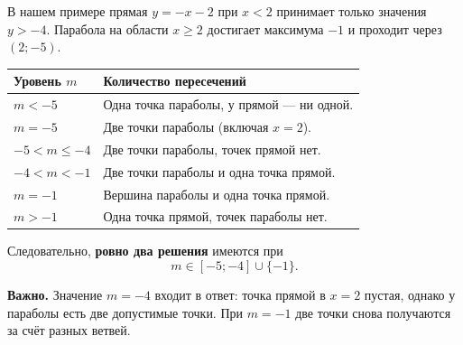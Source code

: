 \documentclass[a4paper,12pt]{article}
\newcommand{\key}[1]{\textcolor{darkaccent}{\textbf{#1}}}
\newcommand{\warn}[1]{\par\textbf{Важно.} #1\par}
\begin{document}
В нашем примере прямая $y=-x-2$ при $x<2$ принимает только значения $y>-4$.
Парабола на области $x\ge2$ достигает максимума $-1$ и проходит через $(2;-5)$.

\begin{center}
\begin{tabularx}{\linewidth}{@{}p{35mm}X@{}}
\toprule
\textbf{Уровень $m$} & \textbf{Количество пересечений}\\
\midrule
$m<-5$ & Одна точка параболы, у прямой --- ни одной.\\
$m=-5$ & Две точки параболы (включая $x=2$).\\
$-5<m\le-4$ & Две точки параболы, точек прямой нет.\\
$-4<m<-1$ & Две точки параболы и одна точка прямой.\\
$m=-1$ & Вершина параболы и одна точка прямой.\\
$m>-1$ & Одна точка прямой, точек параболы нет.\\
\bottomrule
\end{tabularx}
\end{center}

Следовательно, \key{ровно два решения} имеются при
\[
\boxed{m\in[-5;-4]\cup\{-1\}}.
\]
\warn{Значение $m=-4$ входит в ответ: точка прямой в $x=2$ пустая, однако у параболы есть две допустимые точки. При $m=-1$ две точки снова получаются за счёт разных ветвей.}
\end{document}
